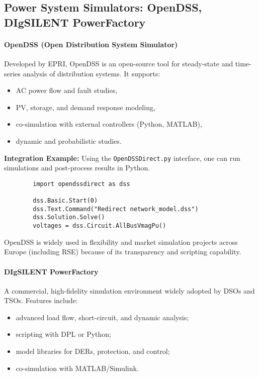 \documentclass[11pt]{article}
\begin{document}
	
	\subsection{Power System Simulators: OpenDSS, DIgSILENT PowerFactory}
	
	\paragraph{OpenDSS (Open Distribution System Simulator)}
	
	Developed by EPRI, OpenDSS is an open-source tool for steady-state and time-series analysis of distribution systems.  
	It supports:
	\begin{itemize}
		\item AC power flow and fault studies,
		\item PV, storage, and demand response modeling,
		\item co-simulation with external controllers (Python, MATLAB),
		\item dynamic and probabilistic studies.
	\end{itemize}
	
	\textbf{Integration Example:}  
	Using the \texttt{OpenDSSDirect.py} interface, one can run simulations and post-process results in Python.
	
	\begin{verbatim}
		import opendssdirect as dss
		
		dss.Basic.Start(0)
		dss.Text.Command("Redirect network_model.dss")
		dss.Solution.Solve()
		voltages = dss.Circuit.AllBusVmagPu()
	\end{verbatim}
	
	OpenDSS is widely used in flexibility and market simulation projects across Europe (including RSE) because of its transparency and scripting capability.
	
	\paragraph{DIgSILENT PowerFactory}
	
	A commercial, high-fidelity simulation environment widely adopted by DSOs and TSOs.  
	Features include:
	\begin{itemize}
		\item advanced load flow, short-circuit, and dynamic analysis;
		\item scripting with DPL or Python;
		\item model libraries for DERs, protection, and control;
		\item co-simulation with MATLAB/Simulink.
	\end{itemize}
	
\end{document}
